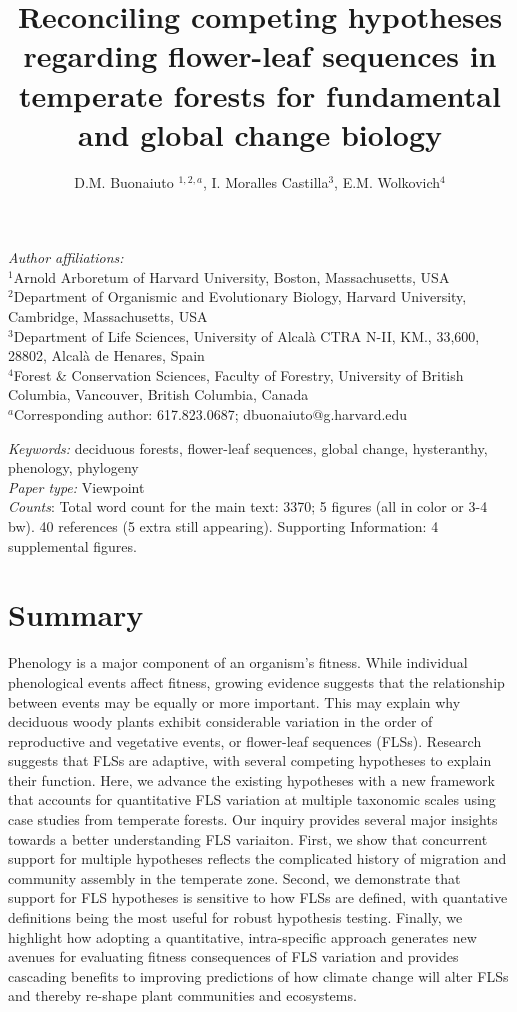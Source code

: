 \documentclass[12pt]{article}
\title{Reconciling competing hypotheses regarding flower-leaf sequences in temperate forests for fundamental and global change biology}
\author{D.M. Buonaiuto $^{1,2,a}$, I. Moralles Castilla$^{3}$, E.M. Wolkovich$^{4}$}
\begin{document}
\maketitle
\noindent \emph{Author affiliations:}\\
\noindent $^1$Arnold Arboretum of Harvard University, Boston, Massachusetts, USA\\
$^2$Department of Organismic and Evolutionary Biology, Harvard University, Cambridge, Massachusetts, USA\\
$^3$Department of Life Sciences, University of Alcal\`a CTRA N-II, KM., 33,600, 28802, Alcal\`a de Henares, Spain\\
$^4$Forest \& Conservation Sciences, Faculty of Forestry, University of British Columbia, Vancouver, British Columbia, Canada\\
$^a$Corresponding author: 617.823.0687; dbuonaiuto@g.harvard.edu

\noindent \emph{Keywords:} deciduous forests, flower-leaf sequences, global change, hysteranthy, phenology, phylogeny \\ %
\emph{Paper type:} Viewpoint\\
 \emph{Counts}: Total word count for the main text: 3370;  5 figures (all in color or 3-4 bw). 40 references (5 extra still appearing). Supporting Information: 4 supplemental figures.\\
\newpage

\section*{Summary}
Phenology is a major component of an organism's fitness. While individual phenological events affect fitness, growing evidence suggests that the relationship between events may be equally or more important. This may explain why deciduous woody plants exhibit considerable variation in the order of reproductive and vegetative events, or flower-leaf sequences (FLSs). Research suggests that FLSs are adaptive, with several competing hypotheses to explain their function. Here, we advance the existing hypotheses with a new framework that accounts for quantitative FLS variation at multiple taxonomic scales using case studies from temperate forests. Our inquiry provides several major insights towards a better understanding FLS variaiton. First, we show that %
concurrent support for multiple hypotheses reflects the complicated history of migration and community assembly in the temperate zone. Second, we demonstrate that support for FLS hypotheses is sensitive to how FLSs are defined, with quantative definitions being the most useful for robust hypothesis testing. Finally, we highlight how adopting a quantitative, intra-specific approach generates new avenues for evaluating fitness consequences of FLS variation and provides cascading benefits to improving predictions of how climate change will alter FLSs and thereby re-shape plant communities and ecosystems.
\end{document}
